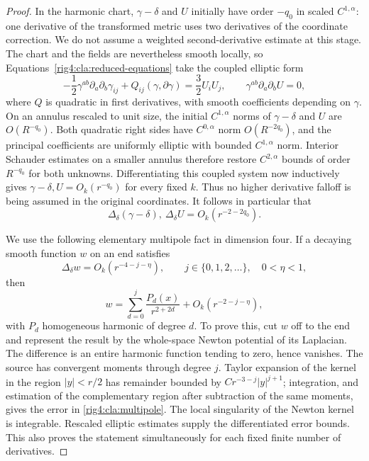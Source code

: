 \begin{proof}
In the harmonic chart, $\gamma-\delta$ and $U$ initially have order
$-q_0$ in scaled $C^{1,\alpha}$: one derivative of the transformed
metric uses two derivatives of the coordinate correction.  We do not
assume a weighted second-derivative estimate at this stage.  The chart
and the fields are nevertheless smooth locally, so
Equations~\eqref{rig4:cla:reduced-equations}
take the coupled elliptic form
\begin{equation}\label{rig4:cla:harmonic-system}
 -\frac12\gamma^{ab}\partial_a\partial_b\gamma_{ij}
       +Q_{ij}(\gamma,\partial\gamma)
       =\frac32 U_iU_j,
 \qquad \gamma^{ab}\partial_a\partial_bU=0,
\end{equation}
where $Q$ is quadratic in first derivatives, with smooth coefficients
depending on $\gamma$.  On an annulus rescaled to unit size, the initial
$C^{1,\alpha}$ norms of $\gamma-\delta$ and $U$ are $O(R^{-q_0})$.
Both quadratic right sides have $C^{0,\alpha}$ norm $O(R^{-2q_0})$,
and the principal coefficients are uniformly elliptic with bounded
$C^{1,\alpha}$ norm.  Interior Schauder estimates on a smaller annulus
therefore restore $C^{2,\alpha}$ bounds of order $R^{-q_0}$ for both
unknowns.  Differentiating this coupled system now inductively gives
$\gamma-\delta,U=O_k(r^{-q_0})$ for every fixed $k$.
Thus no higher derivative falloff is being assumed in the original
coordinates.  It follows in particular that
\begin{equation}\label{rig4:cla:first-euclidean-source}
 \Delta_\delta(\gamma-\delta),\ \Delta_\delta U
       =O_k(r^{-2-2q_0}).
\end{equation}

We use the following elementary multipole fact in dimension four.
If a decaying smooth function $w$ on an end satisfies
\[
 \Delta_\delta w=O_k(r^{-4-j-\eta}),
 \qquad j\in\{0,1,2,\ldots\},\quad 0<\eta<1,
\]
then
\begin{equation}\label{rig4:cla:multipole}
 w=\sum_{d=0}^j\frac{P_d(x)}{r^{2+2d}}
       +O_k(r^{-2-j-\eta}),
\end{equation}
with $P_d$ homogeneous harmonic of degree $d$.  To prove this, cut $w$
off to the end and represent the result by the whole-space Newton
potential of its Laplacian.  The difference is an entire harmonic
function tending to zero, hence vanishes.  The source has convergent
moments through degree $j$.  Taylor expansion of the kernel in the
region $|y|<r/2$ has remainder bounded by
$C r^{-3-j}|y|^{j+1}$; integration, and estimation of the complementary
region after subtraction of the same moments, gives the error in
\eqref{rig4:cla:multipole}.  The local singularity of the Newton kernel is
integrable.  Rescaled elliptic estimates supply the differentiated
error bounds.  This also proves the statement simultaneously for
each fixed finite number of derivatives.


\end{proof}
